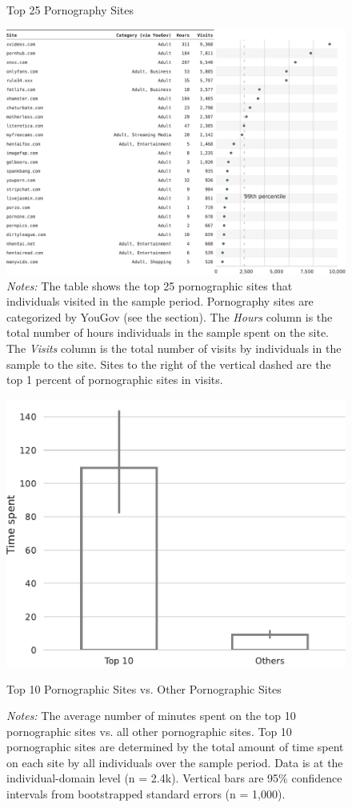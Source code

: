 \documentclass[12pt,twoside]{article}
\begin{document}
\begin{figure}[ht]
	\centering
	\caption{Top 25 Pornography Sites}
	\includegraphics[width=\textwidth]{figs/top_25_adultsites.pdf}
	\caption*{\footnotesize \emph{Notes:} 
		The table shows the top 25 pornographic sites that individuals visited in the sample period.
		Pornography sites are categorized by YouGov (see the  section).
    	The \emph{Hours} column is the total number of hours individuals in the sample spent on the site. 
    	The \emph{Visits} column is the total number of visits by individuals in the sample to the site.
            Sites to the right of the vertical dashed are the top 1 percent of pornographic sites in visits.
	}
	\label{fig:top25_adult}
\end{figure}



\begin{figure}
	\centering
	\includegraphics[width=.5\textwidth]{figs/concentration_porn_consumption.pdf}
	\caption{Top 10 Pornographic Sites vs. Other Pornographic Sites}
	\caption*{\footnotesize \emph{Notes:} 
            The average number of minutes spent on the top 10 pornographic sites vs. all other pornographic sites.
            Top 10 pornographic sites are determined by the total amount of time spent on each site by all individuals over the sample period.
            Data is at the individual-domain level (n = 2.4k).
		Vertical bars are 95\% confidence intervals from bootstrapped standard errors (n = 1,000).
	}
	\label{fig:concentration_porn_consumption}
\end{figure}
\end{document}
